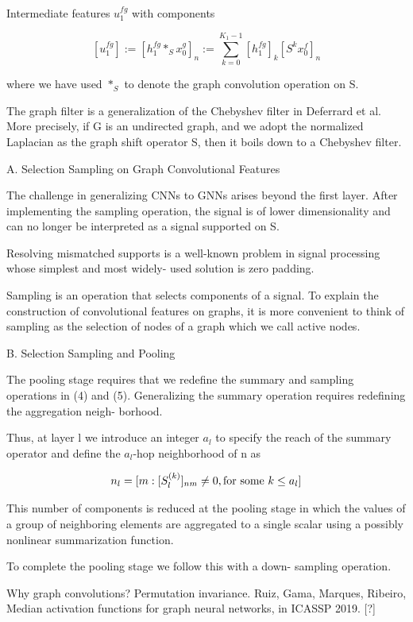 \documentclass[english]{article}
\begin{document}
Intermediate features $u_1^{fg}$ with components

$$
[u_1^{fg}]
:=
[h_1^{fg}*_Sx_0^g]_n
:=
\sum_{k=0}^{K_1-1}
[h_1^{fg}]_k[S^kx_0^f]_n
$$

where we have used $*_S$ to denote the graph convolution
operation on S.

The graph filter is a generalization of the Chebyshev filter
in Deferrard et al. More precisely, if G is an undirected graph, and we
adopt the normalized Laplacian as the graph shift operator S,
then it boils down to a Chebyshev filter.

A. Selection Sampling on Graph Convolutional Features

The challenge in generalizing CNNs to GNNs arises beyond
the first layer. After implementing the sampling operation, the signal is of lower dimensionality  and
can no longer be interpreted as a signal supported on S.

 Resolving mismatched supports is a well-known
problem in signal processing whose simplest and most widely-
used solution is zero padding. 

Sampling is an operation that selects components of a
signal. To explain the construction of convolutional features
on graphs, it is more convenient to think of sampling as the
selection of nodes of a graph which we call active nodes.

B. Selection Sampling and Pooling

The pooling stage requires that we redefine the summary
and sampling operations in (4) and (5). Generalizing the
summary operation requires redefining the aggregation neigh-
borhood.

Thus, at layer l we introduce an integer $a_l$ to specify the reach of the summary operator and define the $a_l$-hop neighborhood of
n as

$$n_l =
[m: [S^{(k)}_l]_{nm}
\neq 0, \textnormal{for some } 
k \leq a_l]
$$

This number of components is reduced at the pooling stage in which the values of a group of neighboring elements are aggregated to a single
scalar using a possibly nonlinear summarization function.


To complete the pooling stage we follow this with a down-
sampling operation.



\item  Why graph convolutions? Permutation invariance. Ruiz, Gama, Marques, Ribeiro, Median activation functions for graph neural networks, in ICASSP 2019. [?]
\end{document}
